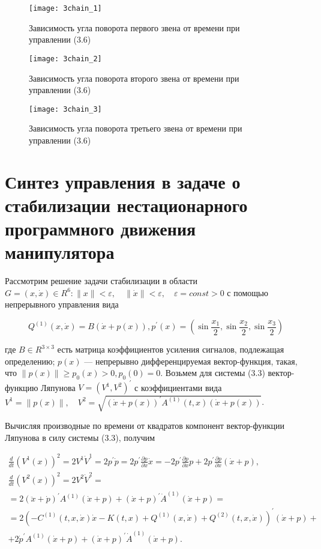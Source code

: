     \begin{figure}[H]
    	\centering
    	\texttt{[image: 3chain\_1]}
    	\caption{Зависимость угла поворота первого звена от времени при управлении (3.6) }
    	\label{fig:manip31}
    \end{figure}
    
    \begin{figure}[H]
    	\centering
    	\texttt{[image: 3chain\_2]}
    	\caption{Зависимость угла поворота второго звена от времени при управлении (3.6)  }
    	\label{fig:manip32}
    \end{figure}
    
    \begin{figure}[H]
    	\centering
    	\texttt{[image: 3chain\_3]}
    	\caption{Зависимость угла поворота третьего звена от времени при управлении (3.6) }
    	\label{fig:manip33}
    \end{figure}
   
 
  \section{Синтез управления в задаче о стабилизации нестационарного программного движения манипулятора}%
 Рассмотрим решение задачи стабилизации в области $G = {(x, \dot x) \in R^6 : \|x\| < \varepsilon, \quad \|\dot x \| < \varepsilon, \quad \varepsilon = const>0}$
 с помощью непрерывного управления вида
 
 \begin{equation}
  Q^{(1)} (x, \dot x) = B(\dot x + p(x)),
  p^{'}(x) = (\sin \frac{x_1}{2}, \sin \frac{x_2}{2}, \sin \frac{x_3}{2})
 \end{equation}
 
 где $B \in R^{3 \times 3}$ есть матрица коэффициентов усиления сигналов, подлежащая определению; $p(x)$ --- непрерывно дифференцируемая вектор-функция, такая, что $\| p(x) \| \ge p_0(x) > 0, p_0(0) = 0$.
 Возьмем для системы (3.3) вектор-функцию Ляпунова $V = (V^1, V^2)^{'}$ с коэффициентами вида $V^1 = \|p(x)\|, \quad V^2 = \sqrt{(\dot x + p(x))^{'} A^{(1)} (t, x) (\dot x + p(x))}$.
 
 Вычисляя производные по времени от квадратов компонент вектор-функции Ляпунова  в силу системы (3.3), получим 
 
 \begin{equation*}
 \begin{array}{c}
 \displaystyle \frac{d}{dt} (V^1(x))^2 = 2 V^1 \dot V^1 = 2 p^{'} \dot p = 2 p^{'} \frac{\partial p }{\partial x} \dot x = -2 p^{'} \frac{\partial p }{\partial x} p + 2 p^{'} \frac{\partial p }{\partial x}(\dot x + p),\\
    \displaystyle \frac{d}{dt} (V^2(x))^2 = 2 V^2 \dot V^2 =\\
   \displaystyle = 2(\ddot x + \dot p)^{'} A^{(1)} (\dot x + p) + (\dot x + p)^{'} \dot A^{(1)} (\dot x + p) =\\
   \displaystyle = 2(- C^{(1)}(t, x, \dot x) \dot x - K(t, x) + Q^{(1)}(x, \dot x) + Q^{(2)}(t, x, \dot x))^{'} (\dot x + p) +\\
   \displaystyle + 2 \dot p^{'} A^{(1)} (\dot x + p) + (\dot x + p)^{'} \dot A^{(1)} (\dot x + p).
 \end{array}
 \end{equation*}
 
